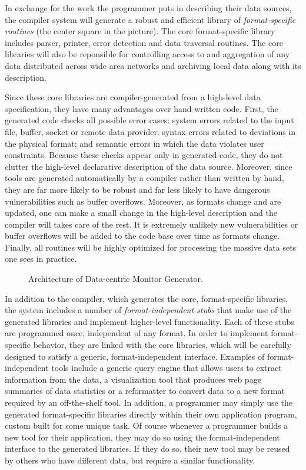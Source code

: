 \documentclass[10pt]{article}
\begin{document}
In exchange for the work the programmer puts in describing their
data sources, the compiler system will generate
a robust and efficient library of {\em format-specific routines} (the center
square in the picture).
The core format-specific 
library includes parser, printer, error detection and data traversal
routines.  The core libraries will also be reponsible for controlling
access to and aggregation of any data distributed across wide area
networks and archiving local data along with its description.  

Since these core libraries are compiler-generated from a
high-level data specification, they have many advantages over
hand-written code.  First, the generated code checks
all possible error cases: system errors related to the input file,
buffer, socket or remote data provider; 
syntax errors related to deviations in the physical
format; and semantic errors in which the data violates user
constraints.  Because these checks appear only in generated code, they
do not clutter the high-level declarative description of the data
source.  Moreover, since tools are generated
automatically by a compiler rather than written by hand, 
they are far more likely to be robust
and far less likely to have dangerous vulnerabilities such as
buffer overflows.  Moreover, as formats change and are updated,
one can make a small change in the high-level description
and the compiler will takes care of the rest.  It is extremely unlikely
new vulnerabilities or buffer overflows will be added to the code
base over time as formats change.  Finally, all routines will
be highly optimized for processing the massive
data sets one sees in practice.

\begin{figure}[t]
\begin{center}
\centerline{}
\end{center}
\caption{\label{fig:arch} Architecture of Data-centric Monitor Generator.
}
\end{figure}

In addition to the compiler, which generates the core, format-specific
libraries, the system includes a number of {\em format-independent stubs}
that make use of the generated libraries and implement higher-level
functionality.  Each of these stubs are programmed once, independent
of any format.  In order to implement format-specific behavior, they
are linked with the core libraries, which will be carefully designed to
satisfy a generic, format-independent interface.  Examples of
format-independent tools include a generic query engine that
allows users to extract information from the data, 
a visualization tool that produces
web page summaries of data statistics or a reformatter to convert data
to a new format required by an off-the-shelf tool.  In addition,
a programmer may simply use the generated format-specific libraries directly 
within their own application program, custom built for some unique task. 
Of course whenever a programmer builds a new tool for their application, 
they may do so using the format-independent interface to the generated
libraries.  If they do so, their new tool may be reused by others
who have different data, but require a similar functionality.
\end{document}
